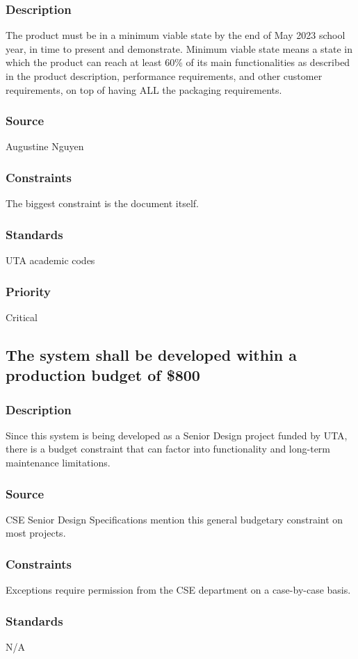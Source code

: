 \subsubsection{Description}
The product must be in a minimum viable state by the end of May 2023 school year, in time to present and demonstrate.  Minimum viable state means a state in which the product can reach at least 60\% of its main functionalities as described in the product description, performance requirements, and other customer requirements, on top of having ALL the packaging requirements.
\subsubsection{Source}
Augustine Nguyen
\subsubsection{Constraints}
The biggest constraint is the document itself.
\subsubsection{Standards}
UTA academic codes
\subsubsection{Priority}
Critical

\subsection{The system shall be developed within a production budget of \$800}
\subsubsection{Description}
Since this system is being developed as a Senior Design project funded by UTA, there is a budget constraint that can factor into functionality and long-term maintenance limitations.
\subsubsection{Source}
CSE Senior Design Specifications mention this general budgetary constraint on most projects. 
\subsubsection{Constraints}
Exceptions require permission from the CSE department on a case-by-case basis.
\subsubsection{Standards}
N/A
